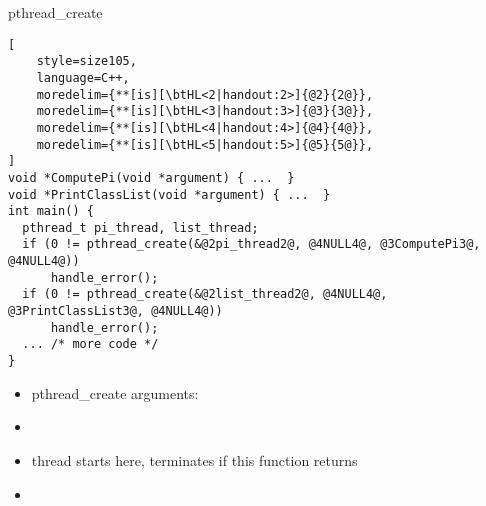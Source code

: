 \begin{frame}[fragile,label=pthreadCreateIntro]{pthread\_create}
\begin{lstlisting}[
    style=size105,
    language=C++,
    moredelim={**[is][\btHL<2|handout:2>]{@2}{2@}},
    moredelim={**[is][\btHL<3|handout:3>]{@3}{3@}},
    moredelim={**[is][\btHL<4|handout:4>]{@4}{4@}},
    moredelim={**[is][\btHL<5|handout:5>]{@5}{5@}},
]
void *ComputePi(void *argument) { ...  }
void *PrintClassList(void *argument) { ...  }
int main() {
  pthread_t pi_thread, list_thread;
  if (0 != pthread_create(&@2pi_thread2@, @4NULL4@, @3ComputePi3@, @4NULL4@))
      handle_error();
  if (0 != pthread_create(&@2list_thread2@, @4NULL4@, @3PrintClassList3@, @4NULL4@))
      handle_error();
  ... /* more code */
}
\end{lstlisting}
    \begin{itemize}
    \item pthread\_create arguments:
    \item {}
    \item {}
        {\fontsize{12}{13}\selectfont thread starts here, terminates if this function returns}
    \item {}
    \end{itemize}
\end{frame}



